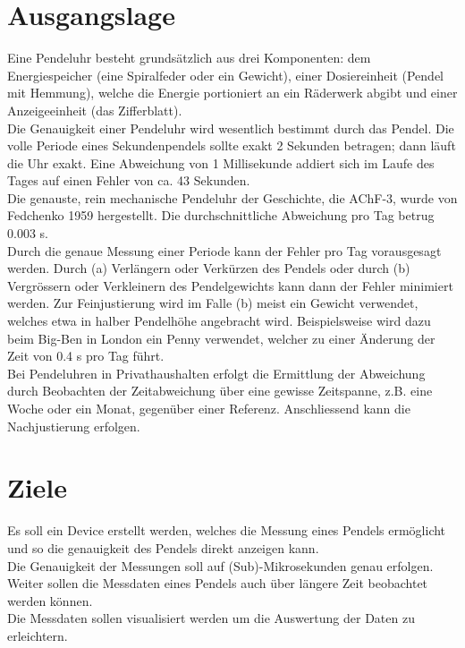 \section{Ausgangslage}%
Eine Pendeluhr besteht grundsätzlich aus drei Komponenten: dem Energiespeicher (eine Spiralfeder
oder ein Gewicht), einer Dosiereinheit (Pendel mit Hemmung), welche die Energie portioniert an ein
Räderwerk abgibt und einer Anzeigeeinheit (das Zifferblatt).\\
Die Genauigkeit einer Pendeluhr wird wesentlich bestimmt durch das Pendel. Die volle Periode eines Sekundenpendels sollte exakt 2 Sekunden betragen; dann läuft die Uhr exakt. Eine Abweichung von 1 Millisekunde addiert sich im Laufe des Tages auf einen Fehler von ca. 43 Sekunden.\\
Die genauste, rein mechanische Pendeluhr der Geschichte, die AChF-3, wurde von Fedchenko 1959
hergestellt. Die durchschnittliche Abweichung pro Tag betrug 0.003 s.\\
Durch die genaue Messung einer Periode kann der Fehler pro Tag vorausgesagt werden. Durch (a)
Verlängern oder Verkürzen des Pendels oder durch (b) Vergrössern oder Verkleinern des
Pendelgewichts kann dann der Fehler minimiert werden. Zur Feinjustierung wird im Falle (b) meist ein
Gewicht verwendet, welches etwa in halber Pendelhöhe angebracht wird. Beispielsweise wird dazu
beim Big-Ben in London ein \glqq{}Penny\grqq{} verwendet, welcher zu einer Änderung der Zeit von 0.4 s pro Tag führt.\\
Bei Pendeluhren in Privathaushalten erfolgt die Ermittlung der Abweichung durch Beobachten der Zeitabweichung über eine gewisse Zeitspanne, z.B. eine Woche oder ein Monat, gegenüber einer Referenz. Anschliessend kann die Nachjustierung erfolgen. 

\section{Ziele}%
Es soll ein Device erstellt werden, welches die Messung eines Pendels ermöglicht und so die genauigkeit des Pendels direkt anzeigen kann.\\
Die Genauigkeit der Messungen soll auf (Sub)-Mikrosekunden genau erfolgen.\\
Weiter sollen die Messdaten eines Pendels auch über längere Zeit beobachtet werden können.\\
Die Messdaten sollen visualisiert werden um die Auswertung der Daten zu erleichtern.

